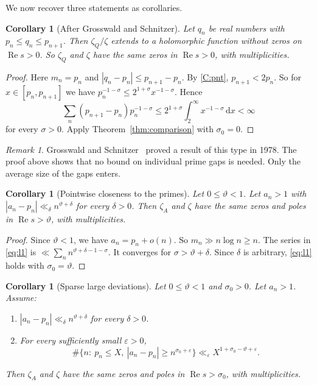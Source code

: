\documentclass[12pt,letterpaper]{article}
\newtheorem{corollary}[theorem]{Corollary}
\theoremstyle{definition}
\theoremstyle{remark}
\newtheorem{remark}[theorem]{Remark}
\numberwithin{equation}{section}
\newcommand{\Ree}{\operatorname{Re}}
\newcommand{\dd}{\,\mathrm{d}}
\newcommand{\eps}{\varepsilon}
\begin{document}
We now recover three statements as corollaries.

\begin{corollary}[After Grosswald and Schnitzer]\label{cor:GS}
Let $q_n$ be real numbers with $p_n\le q_n\le p_{n+1}$. Then $\zeta_Q/\zeta$
extends to a holomorphic function without zeros on $\Ree s>0$. So
$\zeta_Q$ and $\zeta$ have the same zeros in $\Ree s>0$, with
multiplicities.
\end{corollary}

\begin{proof}
Here $m_n=p_n$ and $|q_n-p_n|\le p_{n+1}-p_n$. By \ref{C:pnt},
$p_{n+1}<2p_n$. So for $x\in[p_n,p_{n+1}]$ we have
$p_n^{-1-\sigma}\le2^{1+\sigma}x^{-1-\sigma}$. Hence
\[
\sum_n(p_{n+1}-p_n)p_n^{-1-\sigma}
\le2^{1+\sigma}\int_2^\infty x^{-1-\sigma}\dd x<\infty
\]
for every $\sigma>0$. Apply Theorem~\ref{thm:comparison} with
$\sigma_0=0$.
\end{proof}

\begin{remark}
Grosswald and Schnitzer~\cite{GS78} proved a result of this type in 1978.
The proof above shows that no bound on individual prime
gaps is needed. Only the average size of the gaps enters.
\end{remark}

\begin{corollary}[Pointwise closeness to the primes]\label{cor:pointwise}
Let $0\le\vartheta<1$. Let $a_n>1$ with $|a_n-p_n|\ll_\delta
n^{\vartheta+\delta}$ for every $\delta>0$. Then $\zeta_A$ and $\zeta$
have the same zeros and poles in $\Ree s>\vartheta$, with multiplicities.
\end{corollary}

\begin{proof}
Since $\vartheta<1$, we have $a_n=p_n+o(n)$. So $m_n\gg n\log n\ge n$. The
series in \eqref{eq:l1} is $\ll\sum_n n^{\vartheta+\delta-1-\sigma}$. It
converges for $\sigma>\vartheta+\delta$. Since $\delta$ is arbitrary,
\eqref{eq:l1} holds with $\sigma_0=\vartheta$.
\end{proof}

\begin{corollary}[Sparse large deviations]\label{cor:sparseA}
Let $0\le\vartheta<1$ and $\sigma_0>0$. Let $a_n>1$. Assume:
\begin{enumerate}[label=(\roman*)]
\item $|a_n-p_n|\ll_\delta n^{\vartheta+\delta}$ for every $\delta>0$.
\item For every sufficiently small $\eps>0$,
\[
\#\{n:\ p_n\le X,\ |a_n-p_n|\ge n^{\sigma_0+\eps}\}
\ll_\eps X^{1+\sigma_0-\vartheta+\eps}.
\]
\end{enumerate}
Then $\zeta_A$ and $\zeta$ have the same zeros and poles in
$\Ree s>\sigma_0$, with multiplicities.
\end{corollary}
\end{document}
